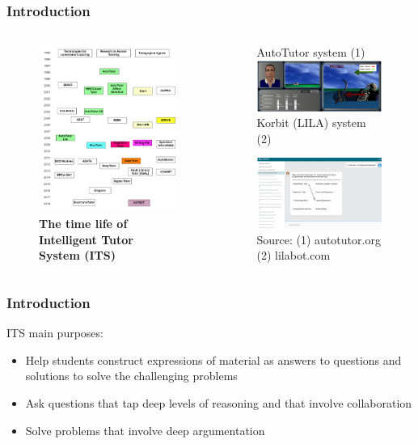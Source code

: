 \documentclass{beamer}
\begin{document}
\begin{frame}
\frametitle{Introduction}
\begin{columns}
	\begin{column}{.45\textwidth}
		\begin{figure}
			\includegraphics[width=45mm]{ht12.png}\\
				{\tiny 	\textbf{The time life of Intelligent Tutor System (ITS)}}
		\end{figure}



	\end{column}
	
	\begin{column}{.55\textwidth}
		
		
			\begin{figure}
				{\tiny 			AutoTutor system (1)}
			\includegraphics[width=45mm]{autotutor.png}\\
{\tiny 			Korbit (LILA) system (2)}
	
			\includegraphics[width=45mm]{lila.png}\\
	{\tiny Source: (1) autotutor.org
	(2) lilabot.com}


		\end{figure}
	

	\end{column}
\end{columns}
\end{frame}


\begin{frame}
\frametitle{Introduction}
	\begin{block}{ITS main purposes: }
	\begin{itemize}
		\item Help students construct expressions of material as answers to questions and solutions to solve the challenging problems
		\item Ask questions that tap deep levels of reasoning and that involve collaboration
		\item Solve problems that involve deep argumentation
	\end{itemize} 
\end{block}
\end{frame}
\end{document}
